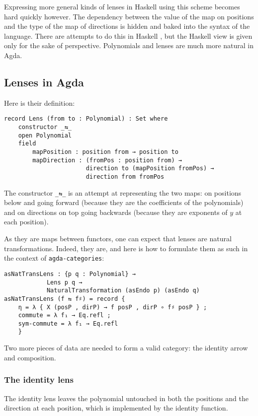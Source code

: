Expressing more general kinds of lenses in Haskell using this scheme becomes hard quickly however.
The dependency between the value of the map on positions and the type of the map of directions is hidden and baked into the syntax of the language. 
There are attempts to do this in Haskell \cite{iceland_jack_thread} \cite{sjoerd_gist}, but the Haskell view is given only for the sake of perspective. Polynomials and lenses are much more natural in Agda.

\subsection*{Lenses in Agda}
Here is their definition:

\begin{verbatim}
record Lens (from to : Polynomial) : Set where
    constructor _⇆_
    open Polynomial
    field
        mapPosition : position from → position to
        mapDirection : (fromPos : position from) → 
                       direction to (mapPosition fromPos) → 
                       direction from fromPos
\end{verbatim}

The constructor \texttt{_⇆_} is an attempt at representing the two maps: on positions below and going forward (because they are the coefficients of the polynomials) and on directions on top going backwards (because they are exponents of $y$ at each position).

As they are maps between functors, one can expect that lenses are natural transformations. Indeed, they are, and here is how to formulate them as such in the context of \texttt{agda-categories}:

\begin{verbatim}
asNatTransLens : {p q : Polynomial} → 
            Lens p q → 
            NaturalTransformation (asEndo p) (asEndo q)
asNatTransLens (f ⇆ f♯) = record { 
    η = λ { X (posP , dirP) → f posP , dirP ∘ f♯ posP } ; 
    commute = λ f₁ → Eq.refl ; 
    sym-commute = λ f₁ → Eq.refl 
    }
\end{verbatim}

Two more pieces of data are needed to form a valid category: the identity arrow and composition. 

\subsubsection{The identity lens}
The identity lens leaves the polynomial untouched in both the positions and the direction at each position, which is implemented by the identity function.

